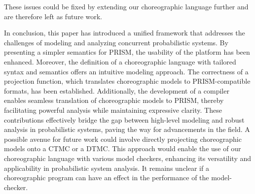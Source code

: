 These issues could be fixed by extending our choreographic language
further and are therefore left as future work.

In conclusion, this paper has introduced a unified framework that
addresses the challenges of modeling and analyzing concurrent
probabilistic systems. By presenting a simpler semantics for PRISM,
the usability of the platform has been enhanced. Moreover, the
definition of a choreographic language with tailored syntax and
semantics offers an intuitive modeling approach. The correctness of a
projection function, which translates choreographic models to
PRISM-compatible formats, has been established. Additionally, the
development of a compiler enables seamless translation of
choreographic models to PRISM, thereby facilitating powerful analysis
while maintaining expressive clarity. These contributions effectively
bridge the gap between high-level modeling and robust analysis in
probabilistic systems, paving the way for advancements in the field.
%
A possible avenue for future work could involve directly projecting
choreographic models onto a CTMC or a DTMC. This approach would enable
the use of our choreographic language with various model checkers,
enhancing its versatility and applicability in probabilistic system
analysis. It remains unclear if a choreographic program can have an
effect in the performance of the model-checker.


